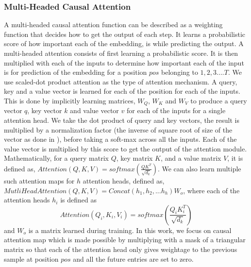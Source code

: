 \documentclass{article}
\begin{document}
\begin{sloppy}
\subsubsection{Multi-Headed Causal Attention} A multi-headed causal attention function can be described as a weighting function that decides how to get the output of each step. It learns a probabilistic score of how important each of the embedding, is while predicting the output.  A multi-headed attention consists of first learning a probabilistic score. It is then multiplied with each of the inputs to determine how important each of the input is for prediction of the embedding for a position $pos$ belonging to  $1,2,3....T$. We use scaled-dot product attention as the type of attention mechanism. A query, key and a value vector is learned for each of the position for each of the inputs. This is done by implicitly learning matrices, $W_Q$, $W_K$ and $W_V$ to produce a query vector $q$, key vector $k$ and value vector $v$ for each of the inputs for a single attention head.  We take the dot product of query and key vectors, the result is multiplied by a normalization factor (the inverse of square root of size of the vector as done in \cite{vaswani2017attention}), before taking a soft-max across all the inputs. Each of the value vector is multiplied by this score to get the output of the attention module. Mathematically, for a query matrix $Q$, key matrix $K$, and a value matrix $V$, it is defined as, $Attention(Q,K,V) = softmax(\frac{QK^T}{\sqrt{d_k}})$. We can also learn multiple such attention maps for $h$ attention heads, defined as, $MutliHeadAttention(Q,K,V) = Concat(h_1,h_2,...h_h)W_o $, 
where each of the attention heads $h_i$ is defined as 
$$Attention(Q_i,K_i,V_i) = softmax(\frac{Q_iK_i^T}{\sqrt{d_k}})$$
and $W_o$ is a matrix learned during training. In this work, we focus on causal attention map which is made possible by multiplying with a mask of a triangular matrix so that each of the attention head only gives weightage to the previous sample at position $pos$ and all the future entries are set to zero.  \cite{brown2020language}


\end{sloppy}
\end{document}
